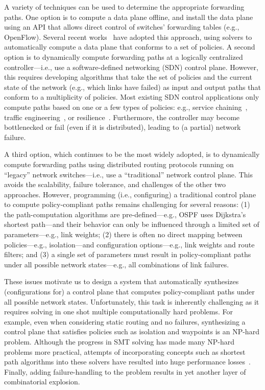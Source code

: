 A variety of techniques can be used to determine the appropriate forwarding
paths. One option is to compute a data plane offline, and install the data
plane using an API that allows direct control of switches' forwarding tables
(e.g., OpenFlow). Several recent works~\cite{merlin, simple} have adopted this
approach, using solvers to automatically compute a data
plane that conforms to a set of policies.  A second option is to dynamically compute forwarding
paths at a logically centralized controller---i.e., use a software-defined
networking (SDN) control plane. However, this requires developing algorithms
that take the set of policies and the current state of the network (e.g.,
which links have failed) as input and output paths that conform to a
multiplicity of policies.  Most existing SDN control applications only compute
paths based on one or a few types of policies: e.g., service
chaining~\cite{simple, flowtags}, traffic engineering~\cite{swan, b4}, or
resilience~\cite{plinko}. Furthermore, the controller may become bottlenecked
or fail (even if it is distributed), leading to (a partial) network failure.

A third option, which continues to be the most widely adopted, is to
dynamically compute forwarding paths using distributed routing protocols
running on ``legacy'' network switches---i.e., use a ``traditional'' network
control plane. This avoids the scalability, failure tolerance, and  challenges of the other two approaches. However, programming (i.e.,
configuring) a traditional control plane to compute policy-compliant paths
remains challenging for several reasons: (1) the path-computation algorithms
are pre-defined---e.g., OSPF uses Dijkstra's shortest path---and their
behavior can only be influenced through a limited set of parameters---e.g.,
link weights; (2) there is often no direct mapping between policies---e.g.,
isolation---and configuration options---e.g., link weights and route filters;
and (3) a single set of parameters must result in policy-compliant paths under
all possible network states---e.g., all combinations of link failures.

These issues motivate us to design a system that automatically synthesizes
(configurations for) a control plane that computes policy-compliant paths
under all possible network states.
Unfortunately, this task is inherently challenging as it requires solving in one shot multiple
computationally hard problems.
For example, even when considering static routing and no failures, synthesizing a control plane that satisfies  policies such as isolation and waypoints
is an NP-hard problem.
Although the progress in SMT solving has made many NP-hard problems more practical, 
 attempts of incorporating concepts such as shortest path algorithms 
into these solvers have resulted into huge performance losses~\cite{monosat}. 
Finally, adding failure-handling to the problem results in yet another layer of combinatorial explosion.

